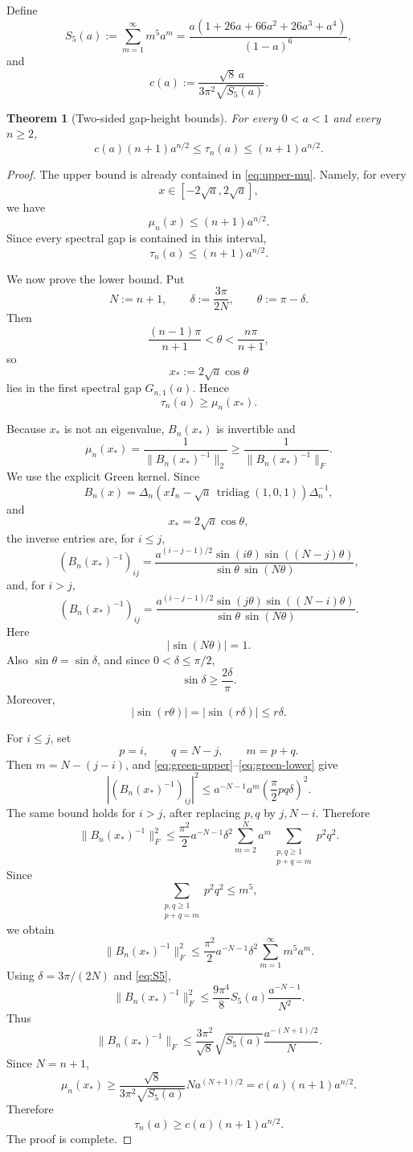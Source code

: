 \documentclass[11pt]{amsart}
\numberwithin{equation}{section}
\DeclareMathOperator{\tridiag}{tridiag}
\newcommand{\B}{B}
\newtheorem{theorem}{Theorem}[section]
\begin{document}
Define
\[
S_5(a):=\sum_{m=1}^{\infty}m^5a^m
=
\frac{a(1+26a+66a^2+26a^3+a^4)}{(1-a)^6},
\tag{6.1}\label{eq:S5}
\]
and
\[
c(a):=
\frac{\sqrt8\,a}{3\pi^2\sqrt{S_5(a)}}.
\tag{6.2}\label{eq:c-a}
\]

\begin{theorem}[Two-sided gap-height bounds]\label{thm:tau-bounds}
For every \(0<a<1\) and every \(n\ge2\),
\[
c(a)(n+1)a^{n/2}
\le
\tau_n(a)
\le
(n+1)a^{n/2}.
\tag{6.3}\label{eq:tau-two-sided}
\]
\end{theorem}

\begin{proof}
The upper bound is already contained in \eqref{eq:upper-mu}.  Namely, for every
\[
x\in[-2\sqrt a,2\sqrt a],
\]
we have
\[
\mu_n(x)\le (n+1)a^{n/2}.
\]
Since every spectral gap is contained in this interval,
\[
\tau_n(a)\le(n+1)a^{n/2}.
\]

We now prove the lower bound.  Put
\[
N:=n+1,
\qquad
\delta:=\frac{3\pi}{2N},
\qquad
\theta:=\pi-\delta.
\]
Then
\[
\frac{(n-1)\pi}{n+1}<\theta<\frac{n\pi}{n+1},
\]
so
\[
x_*:=2\sqrt a\cos\theta
\]
lies in the first spectral gap \(G_{n,1}(a)\).  Hence
\[
\tau_n(a)\ge \mu_n(x_*).
\]

Because \(x_*\) is not an eigenvalue, \(\B_n(x_*)\) is invertible and
\[
\mu_n(x_*)=\frac1{\|\B_n(x_*)^{-1}\|_2}
\ge
\frac1{\|\B_n(x_*)^{-1}\|_F}.
\tag{6.4}\label{eq:Frob-lower}
\]
We use the explicit Green kernel.  Since
\[
\B_n(x)
=
\Delta_n
\left(xI_n-\sqrt a\,\tridiag(1,0,1)\right)
\Delta_n^{-1},
\]
and
\[
x_*=2\sqrt a\cos\theta,
\]
the inverse entries are, for \(i\le j\),
\[
(\B_n(x_*)^{-1})_{ij}
=
\frac{
a^{(i-j-1)/2}\sin(i\theta)\sin((N-j)\theta)
}{
\sin\theta\,\sin(N\theta)
},
\tag{6.5}\label{eq:green-upper}
\]
and, for \(i>j\),
\[
(\B_n(x_*)^{-1})_{ij}
=
\frac{
a^{(i-j-1)/2}\sin(j\theta)\sin((N-i)\theta)
}{
\sin\theta\,\sin(N\theta)
}.
\tag{6.6}\label{eq:green-lower}
\]
Here
\[
|\sin(N\theta)|=1.
\]
Also \(\sin\theta=\sin\delta\), and since \(0<\delta\le\pi/2\),
\[
\sin\delta\ge \frac{2\delta}{\pi}.
\tag{6.7}
\]
Moreover,
\[
|\sin(r\theta)|=|\sin(r\delta)|
\le r\delta.
\tag{6.8}
\]

For \(i\le j\), set
\[
p=i,\qquad q=N-j,\qquad m=p+q.
\]
Then \(m=N-(j-i)\), and \eqref{eq:green-upper}--\eqref{eq:green-lower} give
\[
|(\B_n(x_*)^{-1})_{ij}|^2
\le
a^{-N-1}a^m
\left(\frac{\pi}{2}pq\delta\right)^2.
\]
The same bound holds for \(i>j\), after replacing \(p,q\) by \(j,N-i\).  Therefore
\[
\|\B_n(x_*)^{-1}\|_F^2
\le
\frac{\pi^2}{2}
a^{-N-1}\delta^2
\sum_{m=2}^{N}
a^m
\sum_{\substack{p,q\ge1\\p+q=m}}p^2q^2.
\]
Since
\[
\sum_{\substack{p,q\ge1\\p+q=m}}p^2q^2\le m^5,
\]
we obtain
\[
\|\B_n(x_*)^{-1}\|_F^2
\le
\frac{\pi^2}{2}
a^{-N-1}\delta^2
\sum_{m=1}^{\infty}m^5a^m.
\]
Using \(\delta=3\pi/(2N)\) and \eqref{eq:S5},
\[
\|\B_n(x_*)^{-1}\|_F^2
\le
\frac{9\pi^4}{8}
S_5(a)
\frac{a^{-N-1}}{N^2}.
\]
Thus
\[
\|\B_n(x_*)^{-1}\|_F
\le
\frac{3\pi^2}{\sqrt8}
\sqrt{S_5(a)}
\frac{a^{-(N+1)/2}}{N}.
\]
Since \(N=n+1\),
\[
\mu_n(x_*)
\ge
\frac{\sqrt8}{3\pi^2\sqrt{S_5(a)}}N a^{(N+1)/2}
=
c(a)(n+1)a^{n/2}.
\]
Therefore
\[
\tau_n(a)\ge c(a)(n+1)a^{n/2}.
\]
The proof is complete.
\end{proof}
\end{document}
